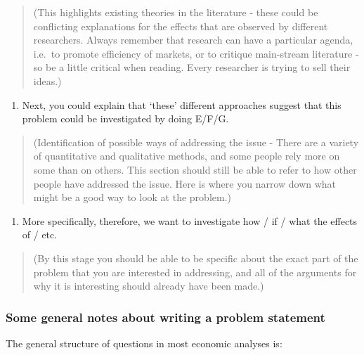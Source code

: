 \documentclass[10pt,twoside]{article}
\providecommand{\tightlist}{%
  \setlength{\itemsep}{0pt}\setlength{\parskip}{0pt}}
\begin{document}
\begin{quote}
(This highlights existing theories in the literature - these could be
conflicting explanations for the effects that are observed by different
researchers. Always remember that research can have a particular agenda,
i.e.~to promote efficiency of markets, or to critique main-stream
literature - so be a little critical when reading. Every researcher is
trying to sell their ideas.)
\end{quote}

\begin{enumerate}
\def\labelenumi{\arabic{enumi}.}
\setcounter{enumi}{2}
\tightlist
\item
  Next, you could explain that `these' different approaches suggest that
  this problem could be investigated by doing E/F/G.
\end{enumerate}

\begin{quote}
(Identification of possible ways of addressing the issue - There are a
variety of quantitative and qualitative methods, and some people rely
more on some than on others. This section should still be able to refer
to how other people have addressed the issue. Here is where you narrow
down what might be a good way to look at the problem.)
\end{quote}

\begin{enumerate}
\def\labelenumi{\arabic{enumi}.}
\setcounter{enumi}{3}
\tightlist
\item
  More specifically, therefore, we want to investigate how / if / what
  the effects of / etc.
\end{enumerate}

\begin{quote}
(By this stage you should be able to be specific about the exact part of
the problem that you are interested in addressing, and all of the
arguments for why it is interesting should already have been made.)
\end{quote}

\hypertarget{some-general-notes-about-writing-a-problem-statement}{%
\subsubsection{Some general notes about writing a problem
statement}\label{some-general-notes-about-writing-a-problem-statement}}

The general structure of questions in most economic analyses is:
\end{document}
